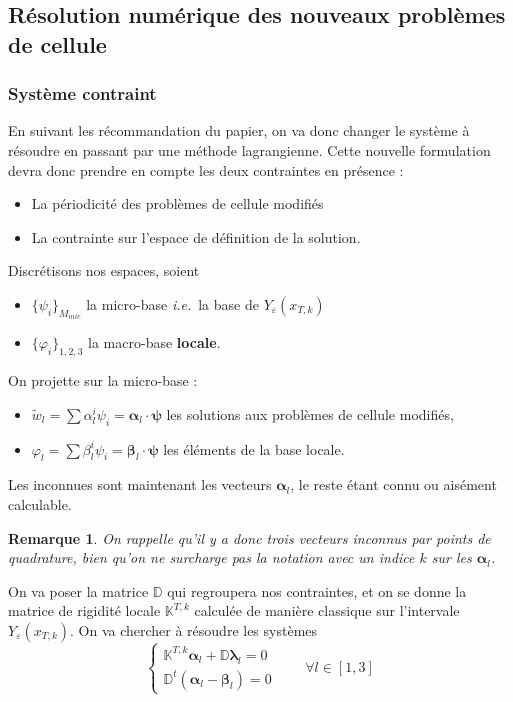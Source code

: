 \documentclass[11pt]{article}
\newtheorem{rmq}{Remarque}
\newcommand{\D}{\mathbb{D}}
\newcommand{\Ktk}{\mathbb{K}^{T,k}}
\newcommand{\Ye}{Y_\varepsilon}
\newcommand{\tw}{\tilde{w}}
\newcommand{\ie}{\emph{i.e.{}}~}
\newcommand{\balpha}{\bm{\alpha}}
\newcommand{\bbeta}{\bm{\beta}}
\newcommand{\blambda}{\bm{\lambda}}
\newcommand{\bpsi}{\bm{\psi}}
\newcommand{\xtk}{x_{T,k}}
\begin{document}
\subsection{Résolution numérique des nouveaux problèmes de cellule}

\subsubsection{Système contraint}


En suivant les récommandation du papier, on va donc changer le système à résoudre en passant par une méthode lagrangienne. Cette nouvelle formulation
devra donc prendre en compte les deux contraintes en présence :
\begin{itemize}
\item La périodicité des problèmes de cellule modifiés
\item La contrainte sur l'espace de définition de la solution.
\end{itemize}
Discrétisons nos espaces,  soient
\begin{itemize}
\item $\{\psi_i\}_{M_{mic}}$ la micro-base \ie la base de $\Ye(\xtk)$ 
\item  $\{\varphi_i\}_{1,2,3}$ la macro-base \textbf{locale}.
\end{itemize}
On projette sur la micro-base :
\begin{itemize}
\item $\tw_l = \sum \alpha^i_l \psi_i = \balpha_l \cdot \bpsi$ \quad les solutions aux problèmes de cellule modifiés,
\item $\varphi_l = \sum \beta^i_l \psi_i = \bbeta_l \cdot \bpsi$ \quad les éléments de la base locale.
\end{itemize}
Les inconnues sont maintenant les vecteurs $\balpha_l$, le reste étant connu ou aisément calculable.
\begin{rmq}
  On rappelle qu'il y a donc trois vecteurs inconnus par points de quadrature, bien qu'on ne surcharge pas la notation avec un indice $k$ sur les
  $\balpha_l$.
\end{rmq}
On va poser la matrice $\D$ qui
regroupera nos contraintes, et on se donne la matrice de rigidité locale $\Ktk$ calculée de manière classique sur l'intervale $\Ye(\xtk)$. On va
chercher à résoudre les systèmes
\begin{equation}
  \label{eq:sysconst}
  \begin{cases}
    \Ktk \balpha_l + \D \blambda_l = 0 \\
    \D^t(\balpha_l - \bbeta_l) = 0 
  \end{cases} \qquad \forall l \in [1, 3]
\end{equation}
\end{document}

